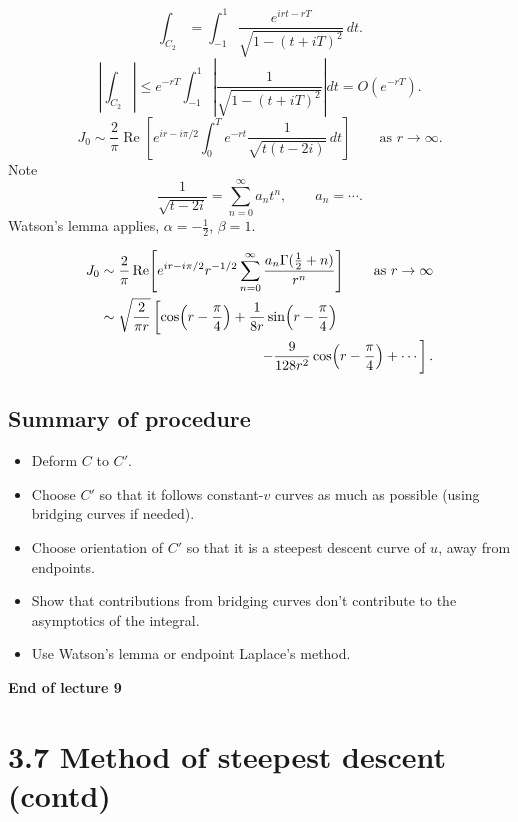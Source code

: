 \documentclass[11pt,a4paper]{article}
\begin{document}
\[
    \int_{C_2}=\int_{-1}^1
    \frac{e^{irt-rT}}{\sqrt{1-(t+iT)^2}}\,dt.
\]
\[
    \left|\int_{C_2}\right|
    \leq e^{-rT}\int_{-1}^1
    \left|\frac1{\sqrt{1-(t+iT)^2}}\right|dt
    =O\!\left(e^{-rT}\right).
\]
\[
    J_0\sim\frac2\pi\operatorname{Re}\!\left[
        e^{ir-i\pi/2}\int_0^T e^{-rt}
        \frac1{\sqrt{t(t-2i)}}\,dt
    \right]
    \qquad \text{as }r\to\infty.
\]
Note
\[
    \frac1{\sqrt{t-2i}}=\sum_{n=0}^{\infty}a_nt^n,
    \qquad a_n=\cdots.
\]
Watson's lemma applies, $\alpha=-\tfrac12$, $\beta=1$.

\begin{align*}
    J_0&\sim\frac2\pi\operatorname{Re}\!\left[
        e^{ir-i\pi/2}r^{-1/2}
        \sum_{n=0}^{\infty}\frac{a_n\Gamma(\tfrac12+n)}{r^n}
    \right]
    \qquad \text{as }r\to\infty\\
    &\sim\sqrt{\frac2{\pi r}}\left[
        \cos\!\left(r-\frac\pi4\right)
        +\frac1{8r}\sin\!\left(r-\frac\pi4\right)\right.\\
    &\hspace{40mm}\left.
        -\frac9{128r^2}\cos\!\left(r-\frac\pi4\right)+\cdots
    \right].
\end{align*}

\subsection*{Summary of procedure}
\begin{itemize}
    \item Deform $C$ to $C'$.
    \item Choose $C'$ so that it follows constant-$v$ curves as much
    as possible (using bridging curves if needed).
    \item Choose orientation of $C'$ so that it is a steepest descent
    curve of $u$, away from endpoints.
    \item Show that contributions from bridging curves don't
    contribute to the asymptotics of the integral.
    \item Use Watson's lemma or endpoint Laplace's method.
\end{itemize}

\begin{center}
    \textbf{End of lecture 9}
\end{center}

\clearpage
\section*{3.7 Method of steepest descent (contd)}
\end{document}
